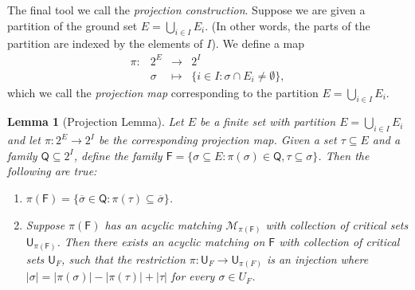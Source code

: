 \documentclass[10pt]{amsart}
\newcommand{\MM}{\mathcal{M}}
\newtheorem{lemma}[thm]{Lemma}
\theoremstyle{definition}
\begin{document}
	The final tool we call the {\em projection construction}. Suppose we are given a partition of the ground set $E = \bigcup_{i\in I} E_i$. (In other words, the parts of the partition are indexed by the elements of $I$). We define a map
	\[\begin{array}{cccl}
	\pi:& 2^E  & \to & 2^{I} \\
	& \sigma & \mapsto & \{i \in I : \sigma \cap E_{i} \neq \emptyset\},
	\end{array}\]
	which we call the {\em projection map} corresponding to the partition $E = \bigcup_{i\in I}E_i$.
	
	
	\begin{lemma}[Projection Lemma]\label{iden}
		Let $E$ be a finite set with partition $E=\bigcup_{i\in I}E_i$ and let $\pi:2^E \to 2^I$ be the corresponding projection map. 
		Given a set $\tau\subseteq E$ and a family $\mathsf{Q}\subseteq 2^I$, define the family $\mathsf{F} = \{\sigma\subseteq E : \pi(\sigma)\in \mathsf{Q}, \tau\subseteq \sigma\}$. Then the following are true:
		\begin{enumerate}
			\item \label{proj lemma easy} $\pi(\mathsf{F})=\{\overline{\sigma}\in \mathsf{Q} : \pi(\tau)\subseteq \overline{\sigma}\}$. 
			\item \label{proj lemma main} Suppose $\pi(\mathsf{F})$ has an acyclic matching $\MM_{\pi(\mathsf{F})}$ with collection of critical sets $\mathsf{U}_{\pi(\mathsf{F})}$. Then 
			there exists an acyclic matching on $\mathsf{F}$ 
			with collection of critical sets $\mathsf{U}_F$, such that the restriction $\pi: \mathsf{U}_F \to \mathsf{U}_{\pi(F)}$ is an injection where $|\sigma|=|\pi(\sigma)|-|\pi(\tau)|+|\tau|$ for every $\sigma \in U_F$.
		\end{enumerate}
	\end{lemma}
	
\end{document}
